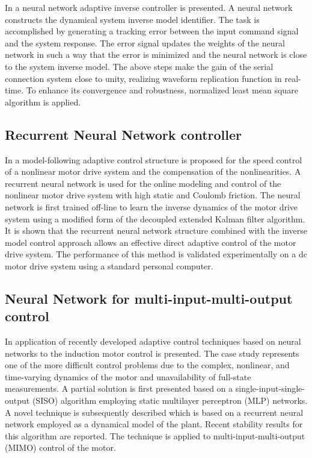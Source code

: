 \documentclass[conference]{IEEEtran}
\begin{document}
In \cite{yao2010adaline} a neural network adaptive inverse controller is presented. A neural network constructs the dynamical system inverse model identifier. The task is accomplished by generating a tracking error between the input command signal and the system response. The error signal updates the weights of the neural network in such a way that the error is minimized and the neural network is close to the system inverse model. The above steps make the gain of the serial connection system close to unity, realizing waveform replication function in real-time. To enhance its convergence and robustness, normalized least mean square algorithm is applied.

\subsection{\textbf{Recurrent Neural Network controller}}

In \cite{nouri2008adaptive} a model-following adaptive control structure is proposed for the speed control of a nonlinear motor drive system and the compensation of the nonlinearities. A recurrent neural network is used for the online modeling and control of the nonlinear motor drive system with high static and Coulomb friction. The neural network is first trained off-line to learn the inverse dynamics of the motor drive system using a modified form of the decoupled extended Kalman filter algorithm. It is shown that the recurrent neural network structure combined with the inverse model control approach allows an effective direct adaptive control of the motor drive system. The performance of this method is validated experimentally on a dc motor drive system using a standard personal computer.

\subsection{\textbf{Neural Network for multi-input-multi-output control}}

In \cite{brdys1999dynamic} application of recently developed adaptive control techniques based on neural networks to the induction motor control is presented. The case study represents one of the more difficult control problems due to the complex, nonlinear, and time-varying dynamics of the motor and unavailability of full-state measurements. A partial solution is first presented based on a single-input-single-output (SISO) algorithm employing static multilayer perceptron (MLP) networks. A novel technique is subsequently described which is based on a recurrent neural network employed as a dynamical model of the plant. Recent stability results for this algorithm are reported. The technique is applied to multi-input-multi-output (MIMO) control of the motor.
\end{document}

